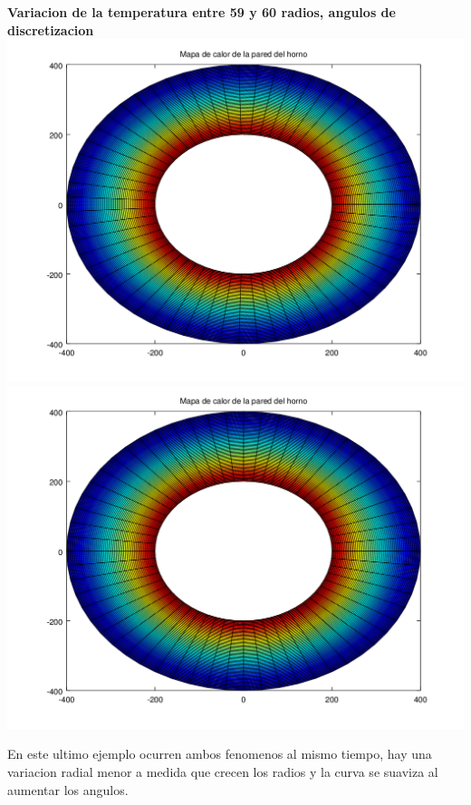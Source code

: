 \begin{enumerate}
		\textbf{Variacion de la temperatura entre 59 y 60 radios, angulos de discretizacion}\\
	  	\includegraphics[scale=0.35]{experimentos1a_1b/evolucion_posicion_isoterma_temperatura/variacion_radios_angulos_se_reduce_diferencia_radial/test11_testord_045_inst_001_heatmap.png}
		\includegraphics[scale=0.35]{experimentos1a_1b/evolucion_posicion_isoterma_temperatura/variacion_radios_angulos_se_reduce_diferencia_radial/test11_testord_046_inst_001_heatmap.png}

\vspace{0.5cm}

En este ultimo ejemplo ocurren ambos fenomenos al mismo tiempo, hay una variacion radial menor a medida que crecen los radios y la curva se suaviza al aumentar los angulos.

\end{enumerate}

